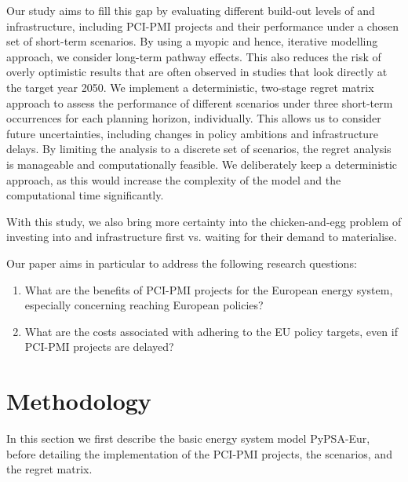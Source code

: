 \documentclass[preprint,12pt,sort&compress]{elsarticle}
\begin{document}
Our study aims to fill this gap by evaluating different build-out levels of  and  infrastructure, including PCI-PMI projects and their performance under a chosen set of short-term scenarios. By using a myopic and hence, iterative modelling approach, we consider long-term pathway effects. This also reduces the risk of overly optimistic results that are often observed in studies that look directly at the target year 2050.
We implement a deterministic, two-stage regret matrix approach to assess the performance of different scenarios under three short-term occurrences for each planning horizon, individually. This allows us to consider future uncertainties, including changes in policy ambitions and infrastructure delays. By limiting the analysis to a discrete set of scenarios, the regret analysis is manageable and computationally feasible. We deliberately keep a deterministic approach, as this would increase the complexity of the model and the computational time significantly.

With this study, we also bring more certainty into the chicken-and-egg problem of investing into  and  infrastructure first vs. waiting for their demand to materialise.

Our paper aims in particular to address the following research questions:

\begin{enumerate} 
  \item What are the benefits of PCI-PMI projects for the European energy system, especially concerning reaching European policies?
  \item What are the costs associated with adhering to the EU policy targets, even if PCI-PMI projects are delayed? 
\end{enumerate}

\section{Methodology}
\label{sec:methodology}
In this section we first describe the basic energy system model PyPSA-Eur, before detailing the implementation of the PCI-PMI projects, the scenarios, and the regret matrix.
\end{document}
